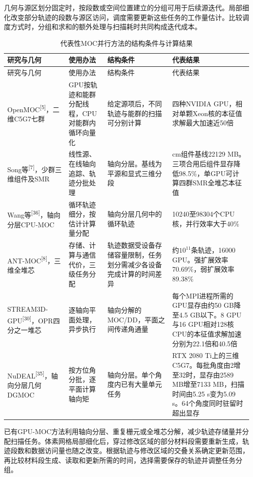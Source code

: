 \documentclass[UTF8, zihao=-4, fontset=none, a4paper]{ctexart}
\newcommand{\upcite}[1]{\textsuperscript{[#1]}}
\begin{document}
几何与源区划分固定时，按段数或空间位置建立的分组可用于后续源迭代。局部细化改变部分轨迹的段数与源区访问，调度需要更新这些任务的工作量估计。比较调度方式时，分组和求和的额外处理与扫描耗时共同构成迭代成本。


\begin{longtable}{@{}>{\raggedright\arraybackslash}p{}>{\raggedright\arraybackslash}p{}>{\raggedright\arraybackslash}p{}>{\raggedright\arraybackslash}p{}@{}}
\caption{代表性MOC并行方法的结构条件与计算结果}\label{tab:2}\\
\toprule
研究与几何 & 使用办法 & 结构条件 & 代表结果 \\
\midrule
\endfirsthead
\toprule
研究与几何 & 使用办法 & 结构条件 & 代表结果 \\
\midrule
\endhead
\bottomrule
\endlastfoot
OpenMOC\upcite{5}，二维C5G7七群 & GPU按轨迹和能群分配线程，CPU对能群内循环向量化 & 给定源项后，不同轨迹与能群的扫描可分别计算 & 四种NVIDIA GPU，相对单颗Xeon核的本征值求解最大加速近50倍 \\
Song等\upcite{7}，少群三维组件及SMR & 线性源、在线轴向追踪、轨迹分批处理 & 轴向分层。基线为平源和显式三维分段 & 25 cm组件基线22129 MB。三项合用后组件显存降低98.5\%，单GPU可计算四群SMR全堆芯本征值 \\
Wang等\upcite{36}，轴向分层CPU-MOC & 循环轨迹细分，按估计计算量分配 & 轴向分层几何中的循环轨迹 & 10240至98304个CPU核，并行效率大于40\% \\
ANT-MOC\upcite{8}，三维全堆芯 & 存储、计算与通信代价，三级任务分配 & 轨迹数据受设备存储容量限制，任务划分需减少各设备完成计算的时间差异 & 约$10^{11}$条轨迹，16000 GPU。强扩展效率70.69\%，弱扩展效率89.38\% \\
STREAM3D-GPU\upcite{30}，OPR四分之一堆芯 & 逐轴向平面处理，异步执行 & 轴向分解的MOC/DD，平面之间传递角通量 & 每个MPI进程所需的GPU显存由约50 GB降至4.5 GB以下。8 GPU与16 GPU相对128核CPU的本征值求解加速分别为22.1倍和40.5倍 \\
NuDEAL\upcite{35}，轴向分层几何DGMOC & 按方位角分批，逐平面计算轴向矩 & 轴向分层。单个角度内已有大量单元任务 & RTX 2080 Ti上的三维C5G7。每批角度由2增至32时，显存由2589 MB增至7133 MB，扫描时间由5.25 s变为5.09 s。64个角度同时驻留时超出显存 \\
\end{longtable}

已有GPU-MOC方法利用轴向分层、重复栅元或全堆芯分解，减少轨迹存储量并分配扫描任务。体素网格局部细化后，穿过修改区域的部分材料段需要重新生成，轨迹段数和数据访问量也随之改变。根据轨迹与修改区域的交叠关系确定更新范围，再比较材料段生成、读取和更新所需的时间，选择需要保存的轨迹并调整任务分组。
\end{document}

